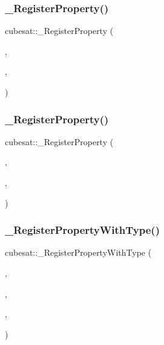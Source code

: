 \mbox{\label{namespacecubesat_adf899b7f005579a222e38a2049d18ecc}} 
\subsubsection{\texorpdfstring{\+\_\+\+Register\+Property()}{\_RegisterProperty()}\hspace{0.1cm}{\footnotesize\ttfamily [92/93]}}
{\footnotesize\ttfamily cubesat\+::\+\_\+\+Register\+Property (\begin{DoxyParamCaption}\item[{\char`\"{}Power\char`\"{}}]{,  }\item[{ploadstruc}]{,  }\item[{power}]{ }\end{DoxyParamCaption})}

\mbox{\label{namespacecubesat_a072dc6b35f6341cb0f601f5255458de4}} 
\subsubsection{\texorpdfstring{\+\_\+\+Register\+Property()}{\_RegisterProperty()}\hspace{0.1cm}{\footnotesize\ttfamily [93/93]}}
{\footnotesize\ttfamily cubesat\+::\+\_\+\+Register\+Property (\begin{DoxyParamCaption}\item[{\char`\"{}U\+TC\char`\"{}}]{,  }\item[{ploadstruc}]{,  }\item[{utc}]{ }\end{DoxyParamCaption})}

\mbox{\label{namespacecubesat_a9bb9ea267b49409f5e5f3def53e6c772}} 
\subsubsection{\texorpdfstring{\+\_\+\+Register\+Property\+With\+Type()}{\_RegisterPropertyWithType()}\hspace{0.1cm}{\footnotesize\ttfamily [1/5]}}
{\footnotesize\ttfamily cubesat\+::\+\_\+\+Register\+Property\+With\+Type (\begin{DoxyParamCaption}\item[{\hyperlink{structcubesat_1_1Vec3}{Vec3}}]{,  }\item[{\char`\"{}Magnetic Field\char`\"{}}]{,  }\item[{imustruc}]{,  }\item[{mag}]{ }\end{DoxyParamCaption})}

